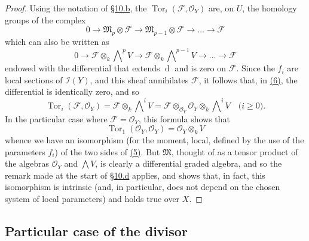 \documentclass{article}
\theoremstyle{plain}
\theoremstyle{definition}
\newcommand{\scr}[1]{{\mathscr{#1}}}
\newcommand{\dd}{\operatorname{d}\!}
\renewcommand{\geq}{\geqslant}
\DeclareMathOperator{\Tor}{Tor}
\begin{document}
\begin{proof}
  Using the notation of \hyperref[subsection10b]{\S10.b}, the $\Tor_i(\scr{F},\scr{O}_Y)$ are, on $U$, the homology groups of the complex
  \[
    0\to\mathfrak{M}_p\otimes\scr{F}\to\mathfrak{M}_{p-1}\otimes\scr{F}\to\ldots\to\scr{F}
  \]
  which can also be written as
  \[
  \label{equation6}
    0 \to \scr{F}\otimes_k\bigwedge\nolimits^p V \to \scr{F}\otimes_k\bigwedge\nolimits^{p-1}V \to \ldots \to \scr{F}
    \tag{6}
  \]
  endowed with the differential that extends $\dd$ and is zero on $\scr{F}$.
  Since the $f_i$ are local sections of $\scr{I}(Y)$, and this sheaf annihilates $\scr{F}$, it follows that, in \hyperref[equation6]{(6)}, the differential is identically zero, and so
  \[
    \Tor_i(\scr{F},\scr{O}_Y) = \scr{F}\otimes_k\bigwedge\nolimits^iV = \scr{F}\otimes_{\scr{O}_Y}\scr{O}_Y\otimes_k\bigwedge\nolimits^i V
    \quad\mbox{($i\geq0$).}
  \]
  In the particular case where $\scr{F}=\scr{O}_Y$, this formula shows that
  \[
    \Tor_1(\scr{O}_Y,\scr{O}_Y) = \scr{O}_Y\otimes_k V
  \]
  whence we have an isomorphism (for the moment, local, defined by the use of the parameters $f_i$) of the two sides of \hyperref[equation5]{(5)}.
  But $\mathfrak{M}$, thought of as a tensor product of the algebras $\scr{O}_Y$ and $\bigwedge V$, is clearly a differential graded algebra, and so the remark made at the start of \hyperref[subsection10d]{\S10.d} applies, and shows that, in fact, this isomorphism is intrinsic (and, in particular, does not depend on the chosen system of local parameters) and holds true over $X$.
\end{proof}


\subsection{Particular case of the divisor}
\label{subsection10e}
\end{document}
